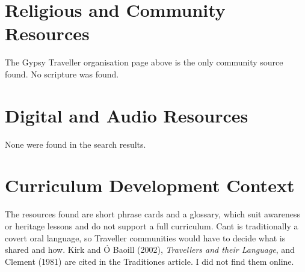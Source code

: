 \documentclass[12pt]{article}
\begin{document}
\section{Religious and Community Resources}
The Gypsy Traveller organisation page above is the only community source found. No scripture was found.

\section{Digital and Audio Resources}
None were found in the search results.

\section{Curriculum Development Context}
The resources found are short phrase cards and a glossary, which suit awareness or heritage lessons and do not support a full curriculum. Cant is traditionally a covert oral language, so Traveller communities would have to decide what is shared and how. Kirk and \'O Baoill (2002), \emph{Travellers and their Language}, and Clement (1981) are cited in the Traditiones article. I did not find them online.
\end{document}
